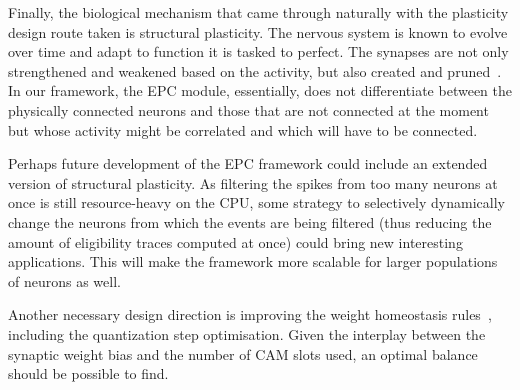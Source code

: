 Finally, the biological mechanism that came through naturally with the plasticity design route taken is structural plasticity. The nervous system is known to evolve over time and adapt to function it is tasked to perfect. The synapses are not only strengthened and weakened based on the activity, but also created and pruned~\cite{Spiess_etal16, George18}. In our framework, the EPC module, essentially, does not differentiate between the physically connected neurons and those that are not connected at the moment but whose activity might be correlated and which will have to be connected.

Perhaps future development of the EPC framework could include an extended version of structural plasticity. As filtering the spikes from too many neurons at once is still resource-heavy on the CPU, some strategy to selectively dynamically change the neurons from which the events are being filtered (thus reducing the amount of eligibility traces computed at once) could bring new interesting applications. This will make the framework more scalable for larger populations of neurons as well.

Another necessary design direction is improving the weight homeostasis rules~\cite{Muller_etal18a, George18}, including the quantization step optimisation. Given the interplay between the synaptic weight bias and the number of CAM slots used, an optimal balance should be possible to find.














